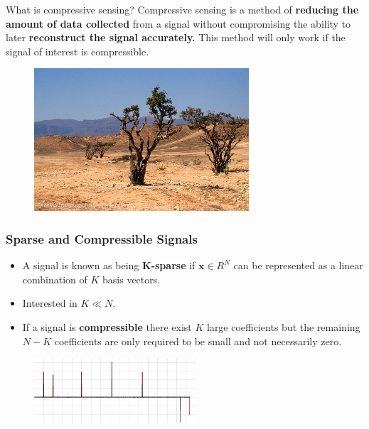 \documentclass[xcolor=dvipsnames,10pt]{beamer}
\begin{document}

 \begin{frame}{What is compressive sensing?}
Compressive sensing is a method of \textbf{reducing the amount of data collected} from a signal without compromising the ability to later \textbf{reconstruct the signal accurately.} This method will only work if the signal of interest is compressible. 

\begin{figure}[h]
        \centering
        \includegraphics[width = 8cm]{sparseD.jpg}
       \end{figure}

\end{frame}

\begin{frame}
  \frametitle{Sparse and Compressible Signals}
  \begin{itemize}
  \item A signal is known as being \textbf{K-sparse} if $\boldsymbol{x} \in R^N$ can be represented as a linear combination of $K$ basis vectors. 
   \item Interested in $K \ll N$.
     \item If a signal is \textbf{compressible} there exist $K$ large coefficients but the remaining $N-K$ coefficients are only required to be small and not necessarily zero. 
  \end{itemize}
 
  \begin{figure}
    \centering
    \includegraphics[width = 6cm]{sparse.png}
  \end{figure}

\end{frame}
\end{document}
